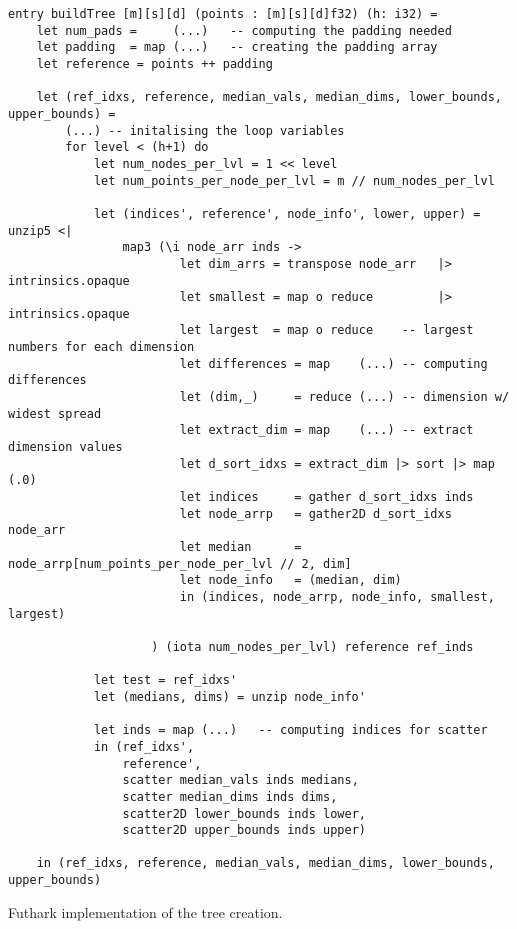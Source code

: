 \begin{listing}[H]
\begin{verbatim}
entry buildTree [m][s][d] (points : [m][s][d]f32) (h: i32) =
    let num_pads =     (...)   -- computing the padding needed
    let padding  = map (...)   -- creating the padding array
    let reference = points ++ padding

    let (ref_idxs, reference, median_vals, median_dims, lower_bounds, upper_bounds) =
    	(...) -- initalising the loop variables
        for level < (h+1) do
            let num_nodes_per_lvl = 1 << level
            let num_points_per_node_per_lvl = m // num_nodes_per_lvl

            let (indices', reference', node_info', lower, upper) = unzip5 <|
                map3 (\i node_arr inds ->
                        let dim_arrs = transpose node_arr   |> intrinsics.opaque
                        let smallest = map o reduce         |> intrinsics.opaque
                        let largest  = map o reduce    -- largest numbers for each dimension
                        let differences = map    (...) -- computing differences
                        let (dim,_)     = reduce (...) -- dimension w/ widest spread
                        let extract_dim = map    (...) -- extract dimension values
                        let d_sort_idxs = extract_dim |> sort |> map (.0)
                        let indices     = gather d_sort_idxs inds
                        let node_arrp   = gather2D d_sort_idxs node_arr
                        let median      = node_arrp[num_points_per_node_per_lvl // 2, dim]
                        let node_info   = (median, dim)
                        in (indices, node_arrp, node_info, smallest, largest)

                    ) (iota num_nodes_per_lvl) reference ref_inds

            let test = ref_idxs'
            let (medians, dims) = unzip node_info'

            let inds = map (...)   -- computing indices for scatter
            in (ref_idxs', 
                reference', 
                scatter median_vals inds medians,
                scatter median_dims inds dims, 
                scatter2D lower_bounds inds lower,
                scatter2D upper_bounds inds upper)

    in (ref_idxs, reference, median_vals, median_dims, lower_bounds, upper_bounds)
\end{verbatim}
\caption{Futhark implementation of the tree creation.}
\label{lst:tree}
\end{listing}



